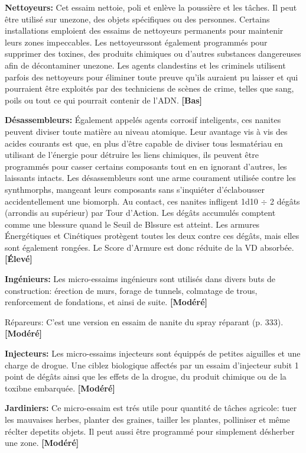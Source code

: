 \textbf{Nettoyeurs:} Cet essaim nettoie, poli et enlève la poussière et les tâches. Il peut être utilisé sur unezone, des objets spécifiques ou des personnes. Certains installations emploient des essaims de nettoyeurs permanents pour maintenir leurs zones impeccables. Les nettoyeurssont également programmés pour supprimer des toxines, des produits chimiques ou d'autres substances dangereuses afin de décontaminer unezone. Les agents clandestins et les criminels utilisent parfois des nettoyeurs pour éliminer toute preuve qu'ils auraient pu laisser et qui pourraient être exploités par des techniciens de scènes de crime, telles que sang, poils ou tout ce qui pourrait contenir de l'ADN. \textbf{[Bas]} 

\textbf{Désassembleurs:} Également appelés agents corrosif inteligents, ces nanites peuvent diviser toute matière au niveau atomique. Leur avantage vis à vis des acides courants est que, en plus d'être capable de diviser tous lesmatériau en utilisant de l'énergie pour détruire les liens chimiques, ils peuvent être programmés pour casser certains composants tout en en ignorant d'autres, les laissants intacts. Les désassembleurs sont une arme courament utilisée contre les synthmorphs, mangeant leurs composants sans s'inquiéter d'éclabousser accidentellement une biomorph. Au contact, ces nanites infligent 1d10 $\div$ 2 dégâts (arrondis au supérieur) par Tour d'Action. Les dégâts accumulés comptent comme une blessure quand le Seuil de Blssure est atteint. Les armures Énergétiques et Cinétiques protègent toutes les deux contre ces dégâts, mais elles sont également rongées. Le Score d'Armure est donc réduite de la VD absorbée. \textbf{[Élevé]} 

\textbf{Ingénieurs:} Les micro-essaims ingénieurs sont utilisés dans divers buts de construction: érection de murs, forage de tunnels, colmatage de trous, renforcement de fondations, et ainsi de suite. \textbf{[Modéré]} 

Répareurs: C'est une version en essaim de nanite du spray réparant (p. 333). \textbf{[Modéré]} 

\textbf{Injecteurs:} Les micro-essaims injecteurs sont équippés de petites aiguilles et une charge de drogue. Une ciblez biologique affectés par un essaim d'injecteur subit 1 point de dégâts ainsi que les effets de la drogue, du produit chimique ou de la toxibne embarquée. \textbf{[Modéré]} 

\textbf{Jardiniers:} Ce micro-essaim est trés utile pour quantité de tâches agricole: tuer les mauvaises herbes, planter des graines, tailler les plantes, polliniser et même réclter depetits objets. Il peut aussi être programmé pour simplement désherber une zone. \textbf{[Modéré]} 


